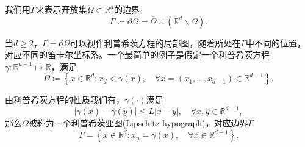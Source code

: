 我们用$\Gamma$来表示开放集$\Omega \subset \mathbb{R}^d$的边界
\begin{equation*}
  \Gamma \coloneqq \partial \Omega = \bar{\Omega} \cup \left( \mathbb{R}^d \backslash \Omega \right).
\end{equation*}

当$d \ge 2$，$\Gamma = \partial \Omega$可以视作利普希茨方程的局部图，随着所处在$\Gamma$中不同的位置，对应不同的笛卡尔坐标系。一个最简单的例子是假定一个利普希茨方程$\gamma: \mathbb{R}^{d-1} \mapsto \mathbb{R}$，满足
\begin{equation*}
  \Omega \coloneqq \left\{
  x \in \mathbb{R}^d: x_d < \gamma(\tilde{x}), \quad \forall \tilde{x}=(x_1,\ldots,x_{d-1}) \in \mathbb{R}^{d-1}
  \right\}.
\end{equation*}

由利普希茨方程的性质我们有，$\gamma(\cdot)$满足
\begin{equation*}
  \big| \gamma(\tilde x) - \gamma (\tilde y) \big|
  \le L \big| \tilde{x} - \tilde{y} \big|, \quad \forall \tilde{x},\tilde{y} \in \mathbb{R}^{d-1},
\end{equation*}
那么$\Omega$被称为一个利普希茨亚图(Lipschitz hypograph)，对应边界$\Gamma$
\begin{equation*}
  \Gamma = \left\{
  x \in \mathbb{R}^d: x_n = \gamma(\tilde{x}), \quad \forall \tilde{x} \in \mathbb{R}^{d-1}
  \right\}.
\end{equation*}

